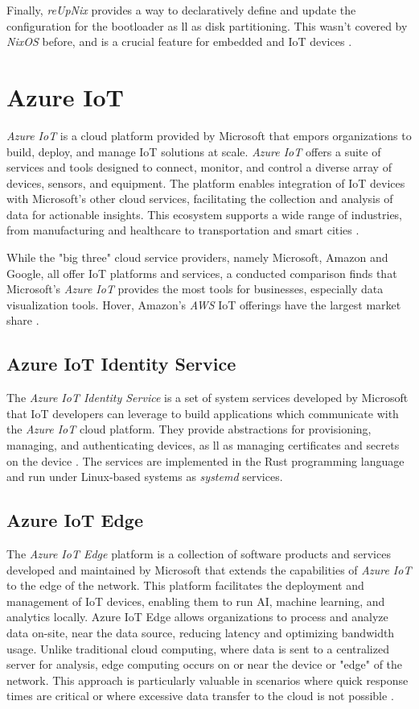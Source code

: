 Finally, \textit{reUpNix} provides a way to declaratively define and update
the configuration for the bootloader as ll as disk partitioning. This wasn't
covered by \textit{NixOS} before, and is a crucial feature for embedded and
\ac{IoT} devices \cite{gollenstede:23:lctes}.

\section{Azure IoT}
\textit{Azure IoT} is a cloud platform provided by Microsoft that
empors organizations to build, deploy, and manage \ac{IoT} solutions at scale.
\textit{Azure IoT} offers a suite of services and tools designed to connect,
monitor, and control a diverse array of devices, sensors, and equipment. The
platform enables integration of \ac{IoT} devices with Microsoft's other cloud
services, facilitating the collection and analysis of data for actionable insights.
This ecosystem supports a wide range of industries, from manufacturing and
healthcare to transportation and smart cities \cite{msdoc-aziot}.

While the "big three" cloud service providers, namely Microsoft, Amazon and
Google, all offer \ac{IoT} platforms and services, a conducted comparison finds
that Microsoft's \textit{Azure IoT} provides the most tools for businesses,
especially data visualization tools. Hover, Amazon's \textit{AWS} \ac{IoT}
offerings have the largest market share \cite{9116254}.

\subsection{Azure IoT Identity Service}
The \textit{Azure IoT Identity Service} is a set of system services developed
by Microsoft that \ac{IoT} developers can leverage to build applications which
communicate with the \textit{Azure IoT} cloud platform. They provide abstractions
for provisioning, managing, and authenticating devices, as ll as managing
certificates and secrets on the device \cite{aiiot}. The services are implemented
in the Rust programming language and run under Linux-based systems as \textit{systemd}
services.


\subsection{Azure IoT Edge}
The \textit{Azure IoT Edge} platform is a collection of software products and
services developed and maintained by Microsoft that extends the capabilities
of \textit{Azure IoT} to the edge of the network. This platform facilitates the
deployment and management of \ac{IoT} devices, enabling them to run \ac{AI},
machine learning, and analytics locally. Azure IoT Edge allows organizations to
process and analyze data on-site, near the data source, reducing latency and
optimizing bandwidth usage.
Unlike traditional cloud computing, where data is sent to a centralized server
for analysis, edge computing occurs on or near the device or "edge" of the
network. This approach is particularly valuable in scenarios where quick
response times are critical or where excessive data transfer to the cloud
is not possible \cite{msdoc-aziotedge}.


